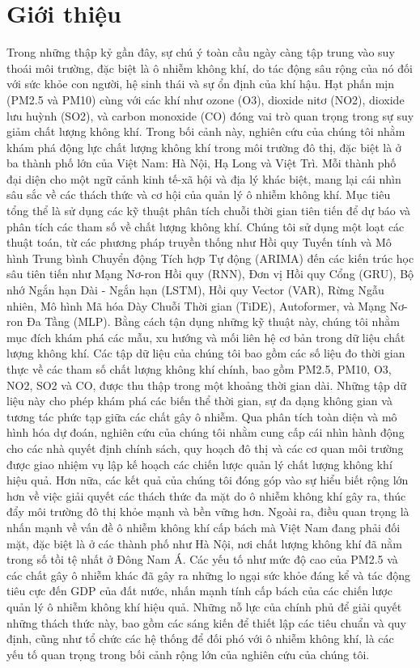 \section{Giới thiệu}
Trong những thập kỷ gần đây, sự chú ý toàn cầu ngày càng tập trung vào suy thoái môi trường, đặc biệt là ô nhiễm không khí, do tác động sâu rộng của nó đối với sức khỏe con người, hệ sinh thái và sự ổn định của khí hậu. Hạt phấn mịn (PM2.5 và PM10) cùng với các khí như ozone (O3), dioxide nitơ (NO2), dioxide lưu huỳnh (SO2), và carbon monoxide (CO) đóng vai trò quan trọng trong sự suy giảm chất lượng không khí.
Trong bối cảnh này, nghiên cứu của chúng tôi nhằm khám phá động lực chất lượng không khí trong môi trường đô thị, đặc biệt là ở ba thành phố lớn của Việt Nam: Hà Nội, Hạ Long và Việt Trì. Mỗi thành phố đại diện cho một ngữ cảnh kinh tế-xã hội và địa lý khác biệt, mang lại cái nhìn sâu sắc về các thách thức và cơ hội của quản lý ô nhiễm không khí.
Mục tiêu tổng thể là sử dụng các kỹ thuật phân tích chuỗi thời gian tiên tiến để dự báo và phân tích các tham số về chất lượng không khí. Chúng tôi sử dụng một loạt các thuật toán, từ các phương pháp truyền thống như Hồi quy Tuyến tính và Mô hình Trung bình Chuyển động Tích hợp Tự động (ARIMA) đến các kiến trúc học sâu tiên tiến như Mạng Nơ-ron Hồi quy (RNN), Đơn vị Hồi quy Cổng (GRU), Bộ nhớ Ngắn hạn Dài - Ngắn hạn (LSTM), Hồi quy Vector (VAR), Rừng Ngẫu nhiên, Mô hình Mã hóa Dày Chuỗi Thời gian (TiDE), Autoformer, và Mạng Nơ-ron Đa Tầng (MLP). Bằng cách tận dụng những kỹ thuật này, chúng tôi nhằm mục đích khám phá các mẫu, xu hướng và mối liên hệ cơ bản trong dữ liệu chất lượng không khí.
Các tập dữ liệu của chúng tôi bao gồm các số liệu đo thời gian thực về các tham số chất lượng không khí chính, bao gồm PM2.5, PM10, O3, NO2, SO2 và CO, được thu thập trong một khoảng thời gian dài. Những tập dữ liệu này cho phép khám phá các biến thể thời gian, sự đa dạng không gian và tương tác phức tạp giữa các chất gây ô nhiễm.
Qua phân tích toàn diện và mô hình hóa dự đoán, nghiên cứu của chúng tôi nhằm cung cấp cái nhìn hành động cho các nhà quyết định chính sách, quy hoạch đô thị và các cơ quan môi trường được giao nhiệm vụ lập kế hoạch các chiến lược quản lý chất lượng không khí hiệu quả. Hơn nữa, các kết quả của chúng tôi đóng góp vào sự hiểu biết rộng lớn hơn về việc giải quyết các thách thức đa mặt do ô nhiễm không khí gây ra, thúc đẩy môi trường đô thị khỏe mạnh và bền vững hơn.
Ngoài ra, điều quan trọng là nhấn mạnh về vấn đề ô nhiễm không khí cấp bách mà Việt Nam đang phải đối mặt, đặc biệt là ở các thành phố như Hà Nội, nơi chất lượng không khí đã nằm trong số tồi tệ nhất ở Đông Nam Á. Các yếu tố như mức độ cao của PM2.5 và các chất gây ô nhiễm khác đã gây ra những lo ngại sức khỏe đáng kể và tác động tiêu cực đến GDP của đất nước, nhấn mạnh tính cấp bách của các chiến lược quản lý ô nhiễm không khí hiệu quả. Những nỗ lực của chính phủ để giải quyết những thách thức này, bao gồm các sáng kiến để thiết lập các tiêu chuẩn và quy định, cũng như tổ chức các hệ thống để đối phó với ô nhiễm không khí, là các yếu tố quan trọng trong bối cảnh rộng lớn của nghiên cứu của chúng tôi.